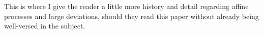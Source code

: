 This is where I give the reader a little more history and detail regarding affine processes and large deviations, should they read this paper without already being well-versed in the subject.

